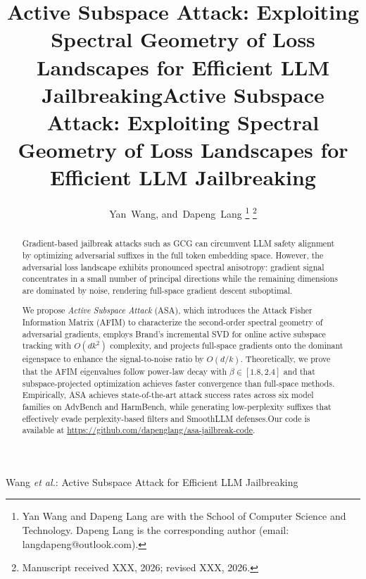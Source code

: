 ﻿\documentclass[lettersize,journal]{IEEEtran}
\begin{document}
\graphicspath{{figures/}}

\title{Active Subspace Attack: Exploiting Spectral Geometry of Loss Landscapes for Efficient LLM Jailbreaking}

\author{Yan~Wang,
        and~Dapeng~Lang
\thanks{Yan Wang and Dapeng Lang are with the School of Computer Science and Technology. Dapeng Lang is the corresponding author (email: langdapeng@outlook.com).}
\thanks{Manuscript received XXX, 2026; revised XXX, 2026.}}

%
{Wang \MakeLowercase{\textit{et al.}}: Active Subspace Attack for Efficient LLM Jailbreaking}


\maketitle


\graphicspath{{figures/}}

\title{Active Subspace Attack: Exploiting Spectral Geometry of Loss Landscapes for Efficient LLM Jailbreaking}

\begin{abstract}

Gradient-based jailbreak attacks such as GCG can circumvent LLM safety alignment by optimizing adversarial suffixes in the full token embedding space. However, the adversarial loss landscape exhibits pronounced spectral anisotropy: gradient signal concentrates in a small number of principal directions while the remaining dimensions are dominated by noise, rendering full-space gradient descent suboptimal.

We propose \textit{Active Subspace Attack} (ASA), which introduces the Attack Fisher Information Matrix (AFIM) to characterize the second-order spectral geometry of adversarial gradients, employs Brand's incremental SVD for online active subspace tracking with $O(dk^2)$ complexity, and projects full-space gradients onto the dominant eigenspace to enhance the signal-to-noise ratio by $O(d/k)$. Theoretically, we prove that the AFIM eigenvalues follow power-law decay with $\beta \in [1.8, 2.4]$ and that subspace-projected optimization achieves faster convergence than full-space methods. Empirically, ASA achieves state-of-the-art attack success rates across six model families on AdvBench and HarmBench, while generating low-perplexity suffixes that effectively evade perplexity-based filters and SmoothLLM defenses.Our code is available at \url{https://github.com/dapenglang/asa-jailbreak-code}.

\end{abstract}
\end{document}
